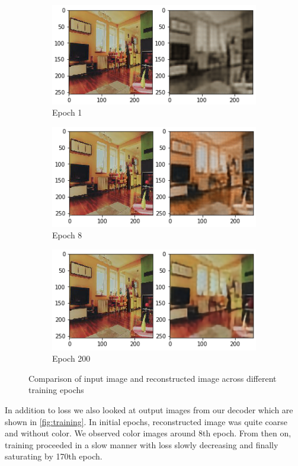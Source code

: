 \documentclass[11pt,a4paper]{article}
\begin{document}
\begin{figure}[]
  \centering
  \begin{subfigure}[b]{0.4\linewidth}
    \includegraphics[width=\linewidth]{ep0.png}
    \caption{Epoch 1}
  \end{subfigure}
  \begin{subfigure}[b]{0.4\linewidth}
    \includegraphics[width=\linewidth]{ep8.png}
    \caption{Epoch 8}
  \end{subfigure}
  \begin{subfigure}[b]{0.4\linewidth}
    \includegraphics[width=\linewidth]{ep200.png}
    \caption{Epoch 200}
  \end{subfigure}
  \caption{Comparison of input image and reconstructed image across different training epochs}
  \label{fig:training}
\end{figure}


In addition to loss we also looked at output images from our decoder which are shown in \autoref{fig:training}. In initial epochs, reconstructed image was quite coarse and without color. We observed color images around 8th epoch. From then on, training proceeded in a slow manner with loss slowly decreasing and finally saturating by 170th epoch.



\end{document}
